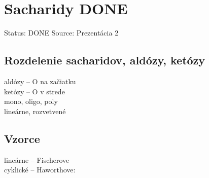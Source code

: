\section{Sacharidy DONE}
Status: DONE
Source: Prezentácia 2
\\
\subsection{Rozdelenie sacharidov, aldózy, ketózy}
aldózy -- O na začiatku\\
ketózy -- O v strede\\
mono, oligo, poly\\
lineárne, rozvetvené\\

\subsection{Vzorce}
lineárne -- Fischerove\\
\tab cyklické -- Haworthove: \\

